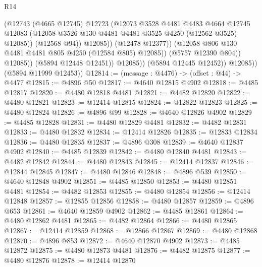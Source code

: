 \begin{lexlean}{R14}
\begin{coremodule}
                                (@12743
                                  (@4665 @12745)
                                  @12723
                                  (@12073
                                    @3528
                                    @4481
                                    @4483
                                    @4664
                                    @12745
                                    @12083
                                    (@12058
                                      @3526
                                      @130
                                      @4481
                                      @4481
                                      @3525
                                      @4250
                                      (@12562 @3525)
                                      @12085))
                                  (@12568 @94))
                                @12085))
                            (@12478 @12377))
                          (@12058 @806 @130 @4481 @4481 @805 @4250 (@12584 @805) @12085))
                        (@5757 @12390 @804))
                      @12085))
                  (@5894 @12448 @12451))
                @12085))
            (@5894 @12445 @12452))
          @12085))
      (@5894 @11999 @12453))
@12814 := (message : @4476) -> (offset : @44) -> @4477
@12815 := @4896 @50
@12817 := @4640 @12815 @4902
@12818 := @4485 @12817
@12820 := @4480 @12818 @4481
@12821 := @4482 @12820
@12822 := @4480 @12821
@12823 := @12414 @12815
@12824 := @12822 @12823
@12825 := @4480 @12824
@12826 := @4896 @99
@12828 := @4640 @12826 @4902
@12829 := @4485 @12828
@12831 := @4480 @12829 @4481
@12832 := @4482 @12831
@12833 := @4480 @12832
@12834 := @12414 @12826
@12835 := @12833 @12834
@12836 := @4480 @12835
@12837 := @4896 @308
@12839 := @4640 @12837 @4902
@12840 := @4485 @12839
@12842 := @4480 @12840 @4481
@12843 := @4482 @12842
@12844 := @4480 @12843
@12845 := @12414 @12837
@12846 := @12844 @12845
@12847 := @4480 @12846
@12848 := @4896 @539
@12850 := @4640 @12848 @4902
@12851 := @4485 @12850
@12853 := @4480 @12851 @4481
@12854 := @4482 @12853
@12855 := @4480 @12854
@12856 := @12414 @12848
@12857 := @12855 @12856
@12858 := @4480 @12857
@12859 := @4896 @653
@12861 := @4640 @12859 @4902
@12862 := @4485 @12861
@12864 := @4480 @12862 @4481
@12865 := @4482 @12864
@12866 := @4480 @12865
@12867 := @12414 @12859
@12868 := @12866 @12867
@12869 := @4480 @12868
@12870 := @4896 @853
@12872 := @4640 @12870 @4902
@12873 := @4485 @12872
@12875 := @4480 @12873 @4481
@12876 := @4482 @12875
@12877 := @4480 @12876
@12878 := @12414 @12870

\end{coremodule}
\end{lexlean}
